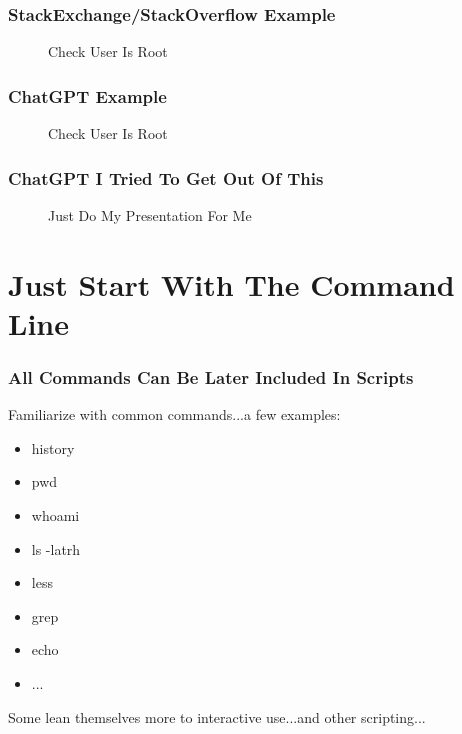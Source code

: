 \documentclass{beamer}
\begin{document}
\begin{frame}\frametitle{StackExchange/StackOverflow Example}
  \begin{figure}[!htb]
    \linewidth
    \begin{center}
    \end{center}
    \caption{Check User Is Root}\label{fig:stack-user-is-root}
  \end{figure}
\end{frame}

\begin{frame}\frametitle{ChatGPT Example}
  \begin{figure}[!htb]
    \linewidth
    \begin{center}
    \end{center}
    \caption{Check User Is Root}\label{fig:chat-user-is-root}
  \end{figure}
\end{frame}

\begin{frame}\frametitle{ChatGPT I Tried To Get Out Of This}
  \begin{figure}[!htb]
    \linewidth
    \begin{center}
    \end{center}
    \caption{Just Do My Presentation For Me}\label{fig:chat-all}
  \end{figure}
\end{frame}

\section{Just Start With The Command Line}
\begin{frame}\frametitle{All Commands Can Be Later Included In Scripts}
  Familiarize with common commands...a few examples:
  \begin{itemize}
  \item history
  \item pwd
  \item whoami
  \item ls -latrh
  \item less
  \item grep
  \item echo
  \item ...
  \end{itemize}

  Some lean themselves more to interactive use...and other scripting...
\end{frame}
\end{document}
